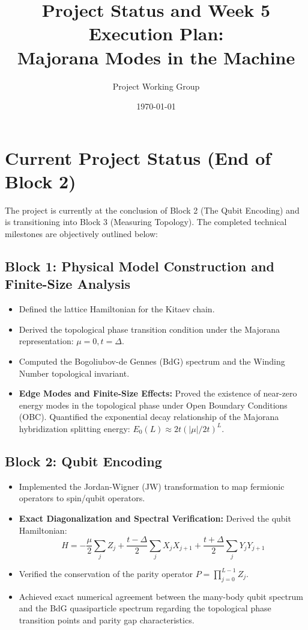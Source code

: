 \documentclass[12pt, a4paper]{article}
\title{Project Status and Week 5 Execution Plan: \\ Majorana Modes in the Machine}
\author{Project Working Group}
\date{\today}
\begin{document}
\maketitle

\section{Current Project Status (End of Block 2)}
The project is currently at the conclusion of Block 2 (The Qubit Encoding) and is transitioning into Block 3 (Measuring Topology). The completed technical milestones are objectively outlined below:

\subsection{Block 1: Physical Model Construction and Finite-Size Analysis}
\begin{itemize}
    \item Defined the lattice Hamiltonian for the Kitaev chain.
    \item Derived the topological phase transition condition under the Majorana representation: $\mu = 0, t = \Delta$.
    \item Computed the Bogoliubov-de Gennes (BdG) spectrum and the Winding Number topological invariant.
    \item \textbf{Edge Modes and Finite-Size Effects:} Proved the existence of near-zero energy modes in the topological phase under Open Boundary Conditions (OBC). Quantified the exponential decay relationship of the Majorana hybridization splitting energy: $E_0(L) \approx 2t(|\mu|/2t)^L$.
\end{itemize}

\subsection{Block 2: Qubit Encoding}
\begin{itemize}
    \item Implemented the Jordan-Wigner (JW) transformation to map fermionic operators to spin/qubit operators.
    \item \textbf{Exact Diagonalization and Spectral Verification:} Derived the qubit Hamiltonian:
    $$H = -\frac{\mu}{2}\sum_j Z_j + \frac{t-\Delta}{2}\sum_j X_j X_{j+1} + \frac{t+\Delta}{2}\sum_j Y_j Y_{j+1}$$
    \item Verified the conservation of the parity operator $P = \prod_{j=0}^{L-1} Z_j$.
    \item Achieved exact numerical agreement between the many-body qubit spectrum and the BdG quasiparticle spectrum regarding the topological phase transition points and parity gap characteristics.
\end{itemize}
\end{document}
